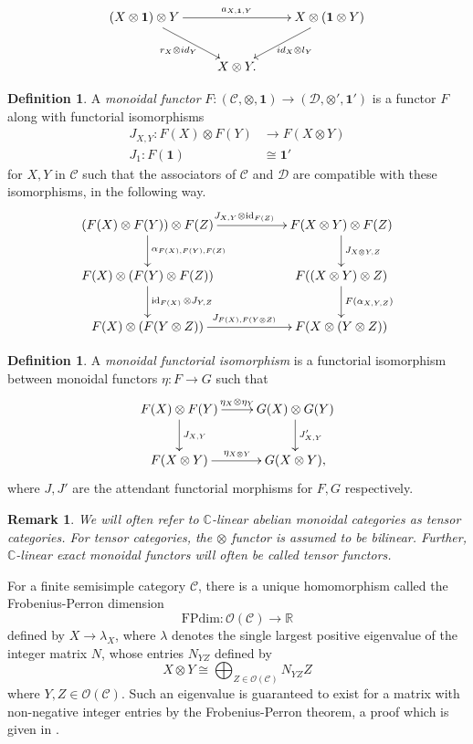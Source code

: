 \documentclass[11pt]{book}
\theoremstyle{Rem}
\newtheorem{Rem}[theorem]{Remark}
\theoremstyle{definition}
\newtheorem{Def}[theorem]{Definition}
\numberwithin{equation}{section}
\newcommand\id{\operatorname{id}}
\newcommand\ot{\otimes}
\newcommand\FPdim{\text{FPdim}}
\newcommand\R{\mathbb R}
\newcommand\kk{\mathbb C}
\newcommand\C{\mathcal C}
\newcommand\OO{\mathcal O}
\newcommand\D{\mathcal D}
\newcommand{\ra}\rightarrow
\newcommand\one{\mathbf{1}}
\begin{document}
\begin{equation}
\xymatrix{
(X \otimes \one) \otimes Y \ar[rr]^{a_{X,\textbf{1},Y}} \ar[dr]_{r_X \otimes id_Y} && X \otimes(\one \otimes Y)\ar[dl]^{id_X \otimes l_Y} \\ 
& X\otimes Y .
}
\end{equation} 
\begin{Def}
A \textit{monoidal functor} $F:(\C, \ot, \one)\rightarrow (\D, \otimes', \one')$ is a functor $F$ along with functorial isomorphisms \begin{align}
	J_{X, Y}: F(X) \otimes F(Y) &\rightarrow F(X\otimes Y)\\
	J_1: F(\one) &\cong \one'
\end{align} 
for $ X, Y$ in $\C$ such that the associators of $\C$ and $\D$ are compatible with these isomorphisms, in the following way.
\[
\xymatrix{
(F(X)\ot F(Y)) \ot F(Z) \ar[rr]^{J_{X, Y}\otimes \id_{F(Z)}} \ar[d]^{\alpha_{F(X), F(Y), F(Z)}} & & F(X\ot Y)\ot F(Z) \ar[d]^{J_{X\otimes Y, Z}} \\
F(X)\ot (F(Y)\ot F(Z))\ar[d]^{\id_{F(X)}\ot J_{Y, Z}}	& & F((X\ot Y)\ot Z)\ar[d]^{F(\alpha_{X, Y, Z})} \\
F(X)\ot (F(Y\ot Z))  \ar[rr]^{J_{F(X), F(Y\otimes Z)}}& & F(X\ot (Y\ot Z))\\
}
\]

\end{Def}
 \begin{Def}
 A \textit{monoidal functorial isomorphism} is a functorial isomorphism between monoidal functors $\eta: F \ra G$ such that \[
\xymatrix { F(X)\ot F(Y) \ar[d]^{J_{X, Y}}\ar[r]^{\eta_X\ot\eta_Y} & G(X) \ot G(Y)\ar[d]^{J'_{X, Y}}\\
F(X\ot Y) \ar[r]^{\eta_{X\ot Y}} & G(X\ot Y),}
 \]
 where $J, J'$ are the attendant functorial morphisms for $F, G$ respectively.
 \end{Def}
\begin{Rem}
We will often refer to $\kk$-linear abelian monoidal categories as tensor categories. For tensor categories, the $\otimes$ functor is assumed to be bilinear. Further, $\kk$-linear exact monoidal functors will often be called tensor functors.
\end{Rem}
For a finite semisimple category $\C$, there is a unique homomorphism called the Frobenius-Perron dimension \begin{equation}
	\FPdim: \OO(\C) \rightarrow \R
\end{equation}  
defined by $X\rightarrow \lambda_X$, where $\lambda$ denotes the single largest positive eigenvalue of the integer matrix $N$, whose entries $N_{YZ}$ defined by \begin{equation}
	X \otimes Y \cong \bigoplus_{Z\in \OO (\C) } N_{YZ} Z 
\end{equation} 
where $Y, Z \in \OO(\C)$. Such an eigenvalue is guaranteed to exist for a matrix with non-negative integer entries by the Frobenius-Perron theorem, a proof which is given in \cite{EGNO}.
\end{document}
